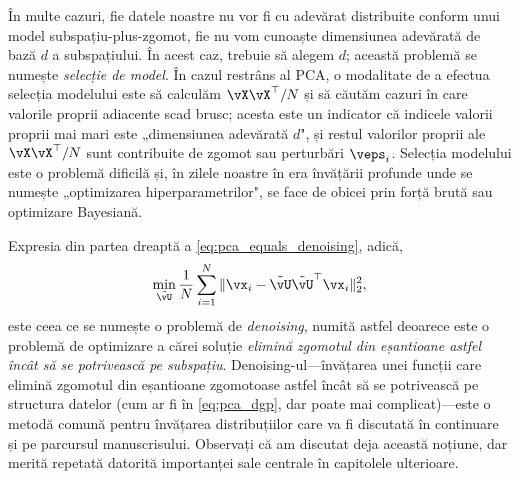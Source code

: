 \documentclass[../../book-main_ro.tex]{subfiles}
\begin{document}
\begin{remark}
    În multe cazuri, fie datele noastre nu vor fi cu adevărat distribuite conform unui model subspațiu-plus-zgomot, fie nu vom cunoaște dimensiunea adevărată de bază \(d\) a subspațiului. În acest caz, trebuie să alegem \(d\); această problemă se numește \textit{selecție de model}. În cazul restrâns al PCA, o modalitate de a efectua selecția modelului este să calculăm \(\vX\vX^{\top}/N\) și să căutăm cazuri în care valorile proprii adiacente scad brusc; acesta este un indicator că indicele valorii proprii mai mari este „dimensiunea adevărată \(d\)", și restul valorilor proprii ale \(\vX\vX^{\top}/N\) sunt contribuite de zgomot sau perturbări \(\veps_{i}\). Selecția modelului este o problemă dificilă și, în zilele noastre în era învățării profunde unde se numește „optimizarea hiperparametrilor", se face de obicei prin forță brută sau optimizare Bayesiană. %
\end{remark}

\begin{remark}
    Expresia din partea dreaptă a \eqref{eq:pca_equals_denoising}, adică,
    \begin{equation}\label{eq:orthogonal_denoising}
        \min_{\tilde{\vU}}\frac{1}{N}\sum_{i = 1}^{N}\norm{\vx_{i} - \tilde{\vU}\tilde{\vU}^{\top}\vx_{i}}_{2}^{2},
    \end{equation}
    este ceea ce se numește o problemă de \textit{denoising}, numită astfel deoarece este o problemă de optimizare a cărei soluție \textit{elimină zgomotul din eșantioane astfel încât să se potrivească pe subspațiu}. Denoising-ul---învățarea unei funcții care elimină zgomotul din eșantioane zgomotoase astfel încât să se potrivească pe structura datelor (cum ar fi în \eqref{eq:pca_dgp}, dar poate mai complicat)---este o metodă comună pentru învățarea distribuțiilor care va fi discutată în continuare și pe parcursul manuscrisului. Observați că am discutat deja această noțiune, dar merită repetată datorită importanței sale centrale în capitolele ulterioare.
\end{remark}
\end{document}
